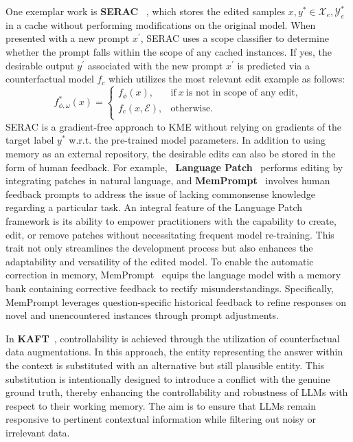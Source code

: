 \documentclass[acmsmall, screen]{acmart}
\begin{document}
One exemplar work is \textbf{SERAC} ~\cite{SERAC}, which stores the edited samples $x, y^{*} \in \mathcal{X}_{e}, \mathcal{Y}^{*}_{e}$ in a cache without performing modifications on the original model. When presented with a new prompt $x^{\prime}$, SERAC uses a scope classifier to determine whether the prompt falls within the scope of any cached instances. If yes, the desirable output $y^{\prime}$ associated with the new prompt $x^{\prime}$ is predicted via a counterfactual model $f_c$ which utilizes the most relevant edit example as follows:
\begin{equation}
      f^*_{\phi,\omega}(x)
      =\left\{\begin{array}{ll}
      f_{\phi}(x),  & \text{if}\  x\ \text{is not in scope of any edit},\\
      f_c(x,\mathcal{E}), & \text{otherwise}.\\
      \end{array}\right.
\end{equation}
SERAC is a gradient-free approach to KME without relying on gradients of the target label $y^{*}$ w.r.t. the pre-trained model parameters. In addition to using memory as an external repository, the desirable edits can also be stored in the form of human feedback. For example, ~\textbf{Language Patch}~\cite{Patch} performs editing by integrating patches in natural language, and \textbf{MemPrompt}~\cite{MemPrompt} involves human feedback prompts to address the issue of lacking commonsense knowledge regarding a particular task. An integral feature of the {Language Patch}~\cite{Patch} framework is its ability to empower practitioners with the capability to create, edit, or remove patches without necessitating frequent model re-training. This trait not only streamlines the development process but also enhances the adaptability and versatility of the edited model. To enable the automatic correction in memory, {MemPrompt}~\cite{MemPrompt} equips the language model with a memory bank containing corrective feedback to rectify misunderstandings. Specifically, MemPrompt leverages question-specific historical feedback to refine responses on novel and unencountered instances through prompt adjustments. 



In \textbf{KAFT}~\cite{KAFT}, controllability is achieved through the utilization of counterfactual data augmentations. In this approach, the entity representing the answer within the context is substituted with an alternative but still plausible entity. This substitution is intentionally designed to introduce a conflict with the genuine ground truth, thereby enhancing the controllability and robustness of LLMs with respect to their working memory. The aim is to ensure that LLMs remain responsive to pertinent contextual information while filtering out noisy or irrelevant data.
\end{document}
